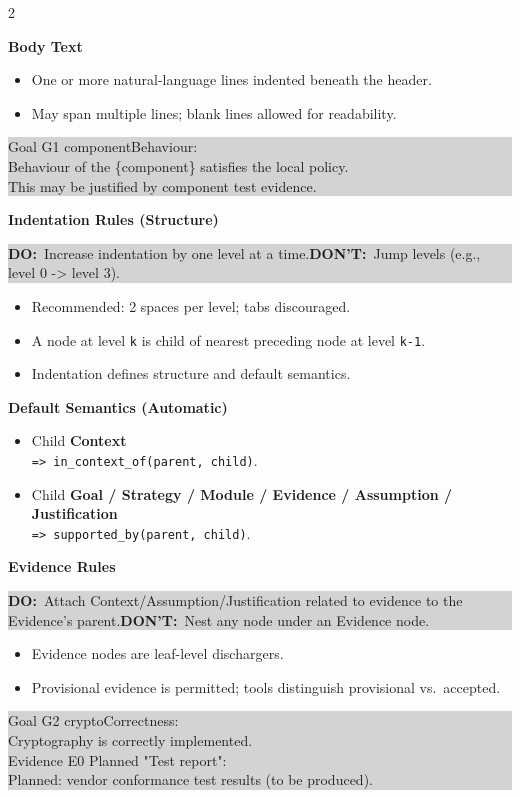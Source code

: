 \documentclass[10pt,letterpaper]{article}
\newcommand{\Sec}[1]{%
  \vspace{5pt}%
  \noindent{\color{RuleGray}\rule{\linewidth}{0.35pt}}\par
  \vspace{2pt}%
  {\bfseries #1}\par
  \vspace{2pt}%
}
\newcommand{\Example}[1]{%
  \vspace{1pt}%
  \noindent\colorbox{LightGray}{%
    \parbox{\linewidth}{\ttfamily\footnotesize\raggedright
#1
    }%
  }%
  \vspace{2pt}%
}
\newcommand{\DoDont}[2]{%
  \vspace{1pt}%
  \noindent\colorbox{LightGray}{%
    \parbox{\linewidth}{\small\textbf{DO:}~#1\hfill \textbf{DON'T:}~#2}%
  }%
  \vspace{2pt}%
}
\begin{document}
\begin{multicols*}{2}
\Sec{Body Text}
\begin{itemize}
  \item One or more natural-language lines indented beneath the header.
  \item May span multiple lines; blank lines allowed for readability.
\end{itemize}
\Example{Goal G1 componentBehaviour:\\
\hspace*{1.5em}Behaviour of the \string\{component\string\} satisfies the local policy.\\
\hspace*{1.5em}This may be justified by component test evidence.}

\columnbreak

\Sec{Indentation Rules (Structure)}
\DoDont{Increase indentation by one level at a time.}{Jump levels (e.g., level 0 -> level 3).}
\begin{itemize}
  \item Recommended: 2 spaces per level; tabs discouraged.
  \item A node at level \texttt{k} is child of nearest preceding node at level \texttt{k-1}.
  \item Indentation defines structure and default semantics.
\end{itemize}

\Sec{Default Semantics (Automatic)}
\begin{itemize}
  \item Child \textbf{Context} \\
        \texttt{=> in\_context\_of(parent, child)}.
  \item Child \textbf{Goal / Strategy / Module / Evidence / Assumption / Justification} \\
        \texttt{=> supported\_by(parent, child)}.
\end{itemize}

\Sec{Evidence Rules}
\DoDont{Attach Context/Assumption/Justification related to evidence to the Evidence's parent.}{Nest any node under an Evidence node.}
\begin{itemize}
  \item Evidence nodes are leaf-level dischargers.
  \item Provisional evidence is permitted; tools distinguish provisional vs.\ accepted.
\end{itemize}
\Example{Goal G2 cryptoCorrectness:\\
\hspace*{1.5em}Cryptography is correctly implemented.\\
\hspace*{1.5em}Evidence E0 Planned "Test report":\\
\hspace*{3.0em}Planned: vendor conformance test results (to be produced).}


\end{multicols*}
\end{document}
